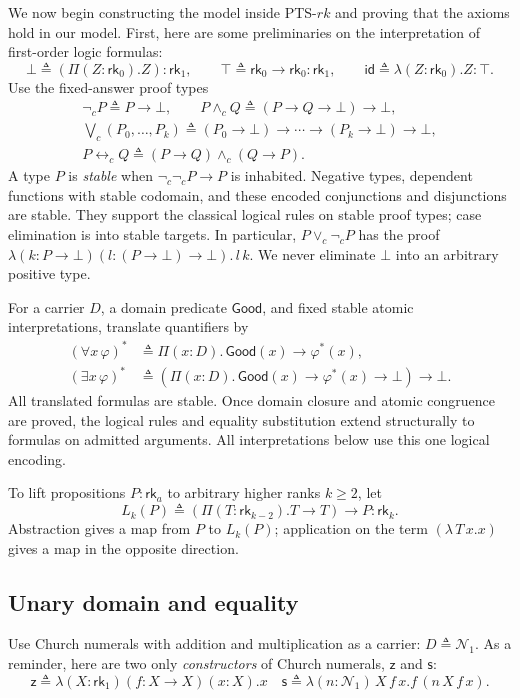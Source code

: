 \documentclass{article}
\theoremstyle{definition}
\theoremstyle{remark}
\newcommand{\rk}[1]{\mathsf{rk}_{#1}}
\newcommand{\Good}{\mathsf{Good}}
\newcommand{\z}{\mathsf z}
\newcommand{\suc}{\mathsf s}
\newcommand{\nc}{\mathop{\neg}\nolimits_c}
\newcommand{\ac}{\mathbin{\wedge_c}}
\newcommand{\oc}{\mathbin{\vee_c}}
\newcommand{\iffc}{\mathbin{\leftrightarrow_c}}
\begin{document}
We now begin constructing the model inside PTS-$rk$ and
proving that the axioms hold in our model. First, here
are some preliminaries on the interpretation of
first-order logic formulas:
\[
    \bot\triangleq(\Pi(Z:\rk0).Z):\rk1,\qquad
    \top\triangleq\rk0\to\rk0:\rk1,\qquad
    \mathsf{id}\triangleq\lambda(Z:\rk0).Z:\top.
\]
Use the fixed-answer proof types
\begin{gather*}
    \nc P\triangleq P\to\bot,\qquad
    P\ac Q\triangleq(P\to Q\to\bot)\to\bot,\\
    \bigvee_c(P_0,\ldots,P_k)\triangleq
    (P_0\to\bot)\to\cdots\to(P_k\to\bot)\to\bot,\\
    P\iffc Q\triangleq(P\to Q)\ac(Q\to P).
\end{gather*}
A type $P$ is \emph{stable} when $\nc\nc P\to P$ is
inhabited. Negative types, dependent functions with
stable codomain, and these encoded conjunctions and
disjunctions are stable. They support the classical
logical rules on stable proof types; case elimination
is into stable targets. In particular, $P\oc\nc P$ has
the proof
$\lambda(k:P\to\bot)(l:(P\to\bot)\to\bot).\,l\,k$.
We never eliminate $\bot$ into an arbitrary positive
type.

For a carrier $D$, a domain predicate $\Good$, and
fixed stable atomic interpretations, translate
quantifiers by
\begin{align*}
    (\forall x\,\varphi)^*&\triangleq
    \Pi(x:D).\,\Good(x)\to\varphi^*(x),\\
    (\exists x\,\varphi)^*&\triangleq
    (\Pi(x:D).\,\Good(x)\to\varphi^*(x)\to\bot)
    \to\bot.
\end{align*}
All translated formulas are stable. Once domain closure
and atomic congruence are proved, the logical rules and
equality substitution extend structurally to formulas
on admitted arguments. All interpretations below use
this one logical encoding.

To lift propositions $P:\rk a$ to arbitrary higher
ranks $k\ge 2$, let
\[
    L_k(P)\triangleq (\Pi(T:\mathsf{rk}_{k-2}).T\to T)
        \to P:\rk k.
\]
Abstraction gives a map from $P$ to $L_k(P)$;
application on the term $(\lambda\,T\,x.x)$ gives a map
in the opposite direction.

\subsection{Unary domain and equality}
Use Church numerals with addition and multiplication as
a carrier: $D\triangleq\mathcal{N}_1$.
As a reminder, here are two only \emph{constructors} of
Church numerals, $\z$ and $\suc$:
\[
    \z\triangleq\lambda(X:\rk 1)(f:X\to X)(x:X).x\quad
    \suc\triangleq\lambda(n:\mathcal{N}_1)\,X\,f\,x.
        f\,(n\,X\,f\,x).
\]
\end{document}
